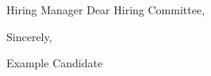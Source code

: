 \documentclass[11pt]{article}
\begin{document}
Hiring Manager\hfill %
Dear Hiring Committee,\par\vspace{10pt}
\vspace{10pt}
\vspace{10pt}
\vspace{18pt}
Sincerely,\par
Example Candidate
\end{document}
